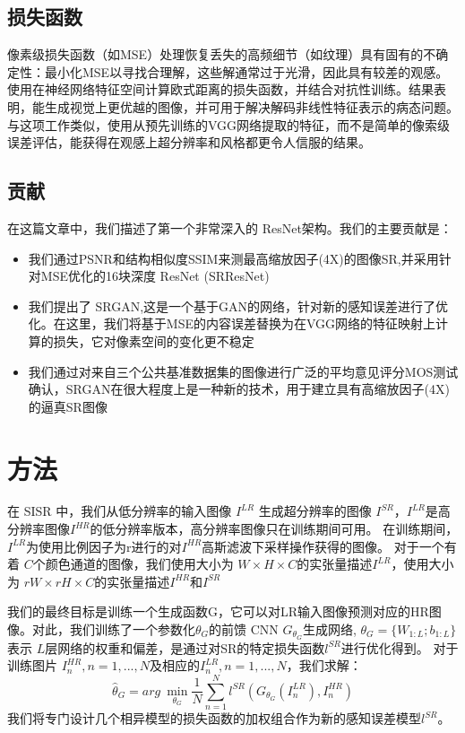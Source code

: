 \documentclass[UTF8,a4paper,10pt]{ctexrep}
\begin{document}
\subsection{损失函数}
像素级损失函数（如MSE）处理恢复丢失的高频细节（如纹理）具有固有的不确定性：最小化MSE以寻找合理解，这些解通常过于光滑，因此具有较差的观感。
使用在神经网络特征空间计算欧式距离的损失函数，并结合对抗性训练。结果表明，能生成视觉上更优越的图像，并可用于解决解码非线性特征表示的病态问题。与这项工作类似，使用从预先训练的VGG网络提取的特征，而不是简单的像索级误差评估，能获得在观感上超分辨率和风格都更令人信服的结果。

\subsection{贡献}
在这篇文章中，我们描述了第一个非常深入的 ResNet架构。我们的主要贡献是：
\begin{itemize}
  \item 我们通过PSNR和结构相似度SSIM来测最高缩放因子(4X)的图像SR,并采用针对MSE优化的16块深度 ResNet (SRResNet)
  \item 我们提出了 SRGAN,这是一个基于GAN的网络，针对新的感知误差进行了优化。在这里，我们将基于MSE的内容误差替换为在VGG网络的特征映射上计算的损失，它对像素空间的变化更不稳定
  \item 我们通过对来自三个公共基准数据集的图像进行广泛的平均意见评分MOS测试确认，SRGAN在很大程度上是一种新的技术，用于建立具有高缩放因子(4X)的逼真SR图像
\end{itemize}

\section{方法}
在 SISR 中，我们从低分辨率的输入图像 $I^{LR}$ 生成超分辨率的图像 $I^{SR}$，$I^{LR}$是高分辨率图像$I^{HR}$的低分辨率版本，高分辨率图像只在训练期间可用。
在训练期间，$I^{LR}$为使用比例因子为r进行的对$I^{HR}$高斯滤波下采样操作获得的图像。
对于一个有着 $C$个颜色通道的图像，我们使用大小为 $W × H × C$的实张量描述$I^{LR}$，使用大小为 $rW × rH × C$的实张量描述$I^{HR}$和$I^{SR}$

我们的最终目标是训练一个生成函数G，它可以对LR输入图像预测对应的HR图像。对此，我们训练了一个参数化$\theta_G$的前馈 CNN $G_{\theta_G}$生成网络,
$\theta_G = \{W_{1:L};b_{1:L}\}$表示 $L$层网络的权重和偏差，是通过对SR的特定损失函数$l^{SR}$进行优化得到。
对于训练图片 $I^{HR}_n, n = 1, ..., N$及相应的$I^{LR}_n, n = 1, ..., N$，我们求解：
\begin{equation}
  \hat{\theta}_G = arg\ \mathop{min}\limits_{\theta_G} \frac{1}{N} \sum_{n = 1}^{N} l^{SR}(G_{\theta_G}(I_n^{LR}), I_n^{HR})\label{eq:1}
\end{equation}
我们将专门设计几个相异模型的损失函数的加权组合作为新的感知误差模型$l^{SR}$。
\end{document}
